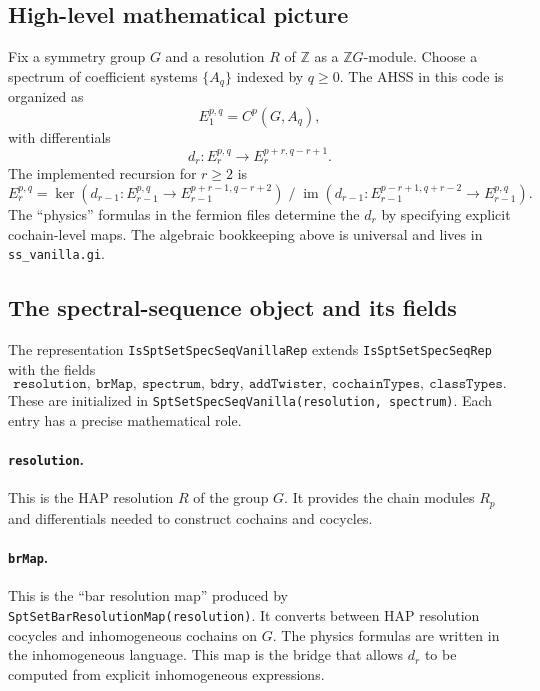 \documentclass{SciPost}
\begin{document}
\subsection{High-level mathematical picture}

Fix a symmetry group $G$ and a resolution $R$ of $\mathbb{Z}$ as a $\mathbb{Z}G$-module.
Choose a spectrum of coefficient systems $\{A_q\}$ indexed by $q\ge 0$.
The AHSS in this code is organized as
\begin{equation}
E_1^{p,q} = C^p(G, A_q),
\end{equation}
with differentials
\begin{equation}
d_r: E_r^{p,q} \to E_r^{p+r, q-r+1}.
\end{equation}
The implemented recursion for $r\ge 2$ is
\begin{equation}
E_r^{p,q} = \ker(d_{r-1}: E_{r-1}^{p,q} \to E_{r-1}^{p+r-1, q-r+2})\;\big/\;\operatorname{im}(d_{r-1}: E_{r-1}^{p-r+1, q+r-2} \to E_{r-1}^{p,q}).
\end{equation}
The ``physics'' formulas in the fermion files determine the $d_r$ by specifying explicit cochain-level maps.
The algebraic bookkeeping above is universal and lives in \texttt{ss\_vanilla.gi}.

\subsection{The spectral-sequence object and its fields}

The representation \texttt{IsSptSetSpecSeqVanillaRep} extends \texttt{IsSptSetSpecSeqRep} with the fields
\begin{equation}
\texttt{resolution},\ \texttt{brMap},\ \texttt{spectrum},\ \texttt{bdry},\ \texttt{addTwister},\ \texttt{cochainTypes},\ \texttt{classTypes}.
\end{equation}
These are initialized in \texttt{SptSetSpecSeqVanilla(resolution, spectrum)}.
Each entry has a precise mathematical role.

\paragraph{\texttt{resolution}.}
This is the HAP resolution $R$ of the group $G$.
It provides the chain modules $R_p$ and differentials needed to construct cochains and cocycles.

\paragraph{\texttt{brMap}.}
This is the ``bar resolution map'' produced by \texttt{SptSetBarResolutionMap(resolution)}.
It converts between HAP resolution cocycles and inhomogeneous cochains on $G$.
The physics formulas are written in the inhomogeneous language.
This map is the bridge that allows $d_r$ to be computed from explicit inhomogeneous expressions.
\end{document}
